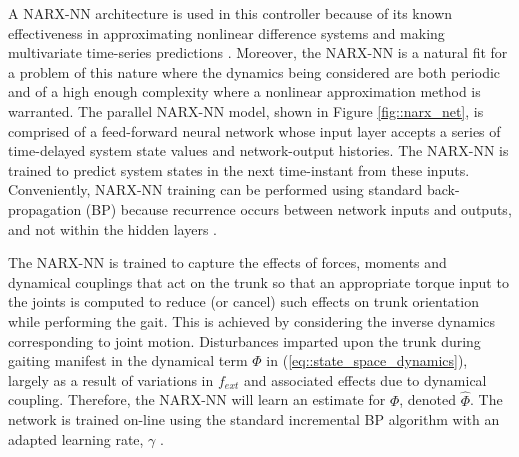 
A NARX-NN architecture is used in this controller because of  its known effectiveness in approximating nonlinear difference systems and making multivariate time-series predictions \cite{Tsungnan1996,ChenBillings1990,Hihi1996,Billings2013}. Moreover, the NARX-NN is a natural fit for a problem of this nature where the dynamics being considered are both periodic and of a high enough complexity where a nonlinear approximation method is warranted. The parallel NARX-NN model, shown in Figure \ref{fig::narx_net}, is comprised of a feed-forward neural network whose input layer accepts a series of time-delayed system state values and network-output histories. The NARX-NN is trained to predict system states in the next time-instant from these inputs. Conveniently, NARX-NN training can be performed using standard back-propagation (BP) because recurrence occurs between network inputs and outputs, and not within the hidden layers \cite{Nelles2001}.

The NARX-NN is trained to capture the effects of forces, moments and dynamical couplings that act on the trunk so that an appropriate torque input to the joints is computed to reduce (or cancel) such effects on trunk orientation while performing the gait. This is achieved by considering the inverse dynamics corresponding to joint motion. Disturbances imparted upon the trunk during gaiting manifest in the dynamical term $\Phi$ in (\ref{eq::state_space_dynamics}), largely as a result of variations in $f_{ext}$ and associated effects due to dynamical coupling. Therefore, the NARX-NN will learn an estimate for $\Phi$, denoted $\hat{\Phi}$. The network is trained on-line using the standard incremental BP algorithm with an adapted learning rate, $\gamma$ \cite{Rumelhart1988,Rumelhart1995}.

